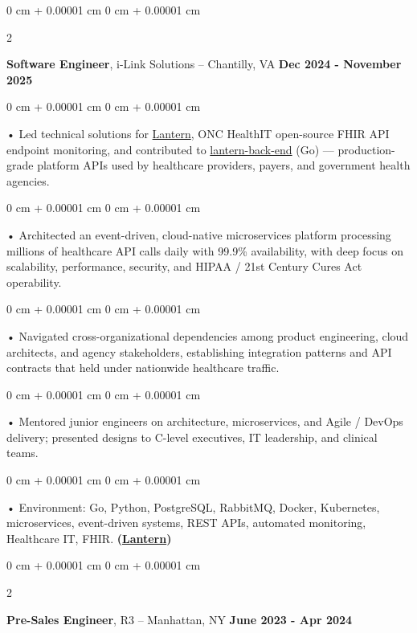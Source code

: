 \documentclass[10pt, letterpaper]{article}
\newenvironment{onecolentry}{
    \begin{adjustwidth}{
        0 cm + 0.00001 cm
    }{
        0 cm + 0.00001 cm
    }
}{
    \end{adjustwidth}
} %
\newenvironment{twocolentry}[2][]{
    \onecolentry
    \def\secondColumn{#2}
    \setcolumnwidth{\fill, 4.5 cm}
    \begin{paracol}{2}
}{
    \switchcolumn \raggedleft \secondColumn
    \end{paracol}
    \endonecolentry
} %
\begin{document}
        \vspace{0.1cm}

        \begin{twocolentry}{
            \textbf{Dec 2024 - November 2025}
        }
            \textbf{Software Engineer}, i-Link Solutions -- Chantilly, VA\end{twocolentry}


        \begin{onecolentry}
             • Led technical solutions for \href{https://lantern.healthit.gov/?tab=dashboard_tab}{Lantern}, ONC HealthIT open-source FHIR API endpoint monitoring, and contributed to \href{https://github.com/onc-healthit/lantern-back-end}{lantern-back-end} (Go) --- production-grade platform APIs used by healthcare providers, payers, and government health agencies.
        \end{onecolentry}
        \begin{onecolentry}
             • Architected an event-driven, cloud-native microservices platform processing millions of healthcare API calls daily with 99.9\% availability, with deep focus on scalability, performance, security, and HIPAA / 21st Century Cures Act operability.
        \end{onecolentry}
        \begin{onecolentry}
             • Navigated cross-organizational dependencies among product engineering, cloud architects, and agency stakeholders, establishing integration patterns and API contracts that held under nationwide healthcare traffic.
        \end{onecolentry}
        \begin{onecolentry}
             • Mentored junior engineers on architecture, microservices, and Agile / DevOps delivery; presented designs to C-level executives, IT leadership, and clinical teams.
        \end{onecolentry}
        \begin{onecolentry}
             • Environment: Go, Python, PostgreSQL, RabbitMQ, Docker, Kubernetes, microservices, event-driven systems, REST APIs, automated monitoring, Healthcare IT, FHIR. \textbf{(\href{https://lantern.healthit.gov/?tab=dashboard_tab}{Lantern})}
        \end{onecolentry}
        \vspace{0.1cm}

        \begin{twocolentry}{
            \textbf{June 2023 - Apr 2024}
        }
            \textbf{Pre-Sales Engineer}, R3 -- Manhattan, NY\end{twocolentry}
\end{document}
